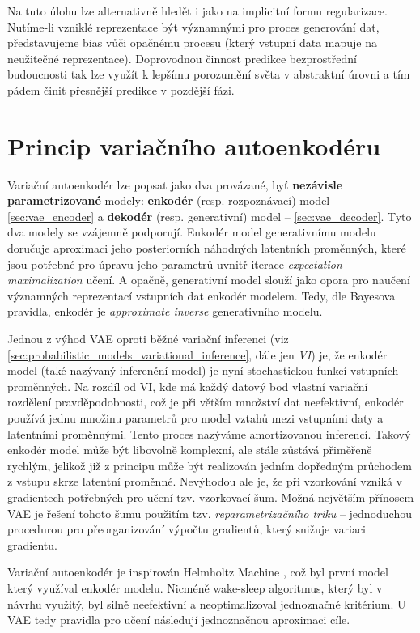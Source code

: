 Na tuto úlohu lze alternativně hledět i jako na implicitní formu regularizace. Nutíme-li vzniklé reprezentace být významnými pro proces generování dat, představujeme bias vůči opačnému procesu (který vstupní data mapuje na neužitečné reprezentace).
Doprovodnou činnost predikce bezprostřední budoucnosti tak lze využít k lepšímu porozumění světa v abstraktní úrovni a tím pádem činit přesnější predikce v pozdější fázi. \cite{Goodfellow2016}

\newpage
\section{Princip variačního autoenkodéru}
Variační autoenkodér lze popsat jako dva provázané, byť \textbf{nezávisle parametrizované} modely: \textbf{enkodér} (resp. rozpoznávací) model – \autoref{sec:vae_encoder} a \textbf{dekodér} (resp. generativní) model – \autoref{sec:vae_decoder}.
Tyto dva modely se vzájemně podporují. Enkodér model generativnímu modelu doručuje aproximaci jeho posteriorních náhodných latentních proměnných,
které jsou potřebné pro úpravu jeho parametrů uvnitř iterace \emph{expectation maximalization} učení.
A opačně, generativní model slouží jako opora pro naučení významných reprezentací vstupních dat enkodér modelem.
Tedy, dle Bayesova pravidla, enkodér je \emph{approximate inverse} generativního modelu. \cite{Kingma2019}

Jednou z výhod VAE oproti běžné variační inferenci (viz \autoref{sec:probabilistic_models_variational_inference}, dále jen \emph{VI}) je, že enkodér model (také nazývaný inferenční model) je nyní stochastickou funkcí vstupních proměnných.
Na rozdíl od VI, kde má každý datový bod vlastní variační rozdělení pravděpodobnosti, což je při větším množství dat neefektivní,
enkodér používá jednu množinu parametrů pro model vztahů mezi vstupními daty a latentními proměnnými. Tento proces nazýváme amortizovanou inferencí.
Takový enkodér model může být libovolně komplexní, ale stále zůstává přiměřeně rychlým, jelikož již z principu může být realizován jedním dopředným průchodem z vstupu skrze latentní proměnné.
Nevýhodou ale je, že při vzorkování vzniká v gradientech potřebných pro učení tzv. vzorkovací šum. Možná největším přínosem VAE je řešení tohoto šumu použitím tzv. \emph{reparametrizačního triku} – jednoduchou procedurou pro přeorganizování výpočtu gradientů, který snižuje variaci gradientu. \cite{Kingma2019}

Variační autoenkodér je inspirován Helmholtz Machine \cite{Dayan1995}, což byl první model který využíval enkodér modelu.
Nicméně wake-sleep algoritmus, který byl v návrhu využitý, byl silně neefektivní a neoptimalizoval jednoznačné kritérium.
U VAE tedy pravidla pro učení následují jednoznačnou aproximaci cíle. \cite{Kingma2019}

